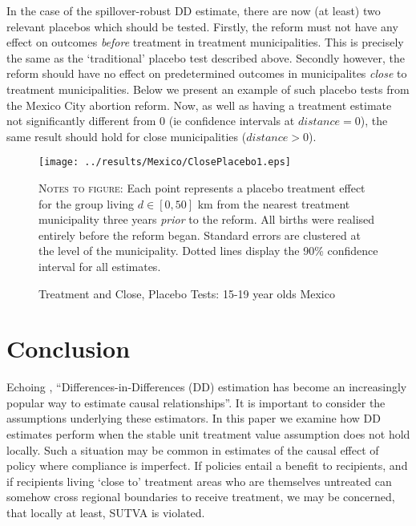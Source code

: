 \documentclass{article}
\begin{document}
\begin{spacing}{1.3}
In the case of the spillover-robust DD estimate, there are now (at least) two
relevant placebos which should be tested.  Firstly, the reform must not have any
effect on outcomes \emph{before} treatment in treatment municipalities.  This is
precisely the same as the `traditional' placebo test described above.  Secondly
however, the reform should have no effect on predetermined outcomes in municipalites
\emph{close} to treatment municipalities.  Below we present an example of such 
placebo tests from the Mexico City abortion reform.  Now, as well as having a 
treatment estimate not significantly different from 0 (ie confidence intervals
at $distance=0$), the same result should hold for close municipalities ($distance>0$).
\begin{figure}[h!]
\texttt{[image: ../results/Mexico/ClosePlacebo1.eps]}
\caption{Treatment and Close, Placebo Tests: 15-19 year olds Mexico}
\label{SFig:MexClose}
\vspace{2mm}
\begin{footnotesize}
\textsc{Notes to figure}: Each point represents a placebo treatment effect for the 
group living $d\in [0,50]$ km from the nearest treatment municipality three years
\emph{prior} to the reform.  All births were realised entirely before the reform
began.  Standard errors are clustered at the level of the municipality.  Dotted 
lines display the 90\% confidence interval for all estimates.
\end{footnotesize}
\end{figure}




\section{Conclusion}
Echoing \citet{Bertrandetal2004}, ``Differences-in-Differences (DD) estimation 
has become an increasingly popular way to estimate causal relationships''.  
It is important to consider the assumptions underlying these estimators.  
In this paper we examine how DD estimates perform when the stable unit treatment 
value assumption does not hold locally.  Such a situation may be common in estimates 
of the causal effect of policy where compliance is imperfect.  If policies entail a 
benefit to recipients, and if recipients living `close to' treatment areas who are 
themselves untreated can somehow cross regional boundaries to receive treatment, we 
may be concerned, that locally at least, SUTVA is violated.


\end{spacing}
\end{document}
